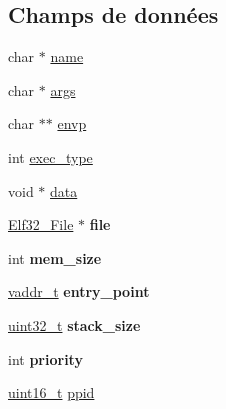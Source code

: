 \subsection*{Champs de données}
\begin{DoxyCompactItemize}
\item 
char $\ast$ \hyperlink{structprocess__init__data__t_a6bdcab0bceaafa6e65a236904fb5a157}{name}
\item 
char $\ast$ \hyperlink{structprocess__init__data__t_a16d011771835f06e0bb3d5fd6115e13c}{args}
\item 
char $\ast$$\ast$ \hyperlink{structprocess__init__data__t_a863d82fbd718f53164a520f67376eac2}{envp}
\item 
int \hyperlink{structprocess__init__data__t_a1cda790f7d2446a04562094f09e358ab}{exec\+\_\+type}
\item 
void $\ast$ \hyperlink{structprocess__init__data__t_ae950cc2a2cc04d1c00a71f70c2fde72c}{data}
\item 
\hypertarget{structprocess__init__data__t_a423d726f5e4621a1aae6a6d96ed2c380}{\hyperlink{structElf32__File}{Elf32\+\_\+\+File} $\ast$ {\bfseries file}}\label{structprocess__init__data__t_a423d726f5e4621a1aae6a6d96ed2c380}

\item 
\hypertarget{structprocess__init__data__t_ae720e802d58d2f1457e34998063695a1}{int {\bfseries mem\+\_\+size}}\label{structprocess__init__data__t_ae720e802d58d2f1457e34998063695a1}

\item 
\hypertarget{structprocess__init__data__t_acf333ed57db9a2ca636801dcbc41da7e}{\hyperlink{kernel_2include_2types_8h_a53428b953a0ae6fba02a5b3596c867e0}{vaddr\+\_\+t} {\bfseries entry\+\_\+point}}\label{structprocess__init__data__t_acf333ed57db9a2ca636801dcbc41da7e}

\item 
\hypertarget{structprocess__init__data__t_a8a9c2d2d0d602f8e2f3dc2f4c425da29}{\hyperlink{kernel_2include_2types_8h_a33594304e786b158f3fb30289278f5af}{uint32\+\_\+t} {\bfseries stack\+\_\+size}}\label{structprocess__init__data__t_a8a9c2d2d0d602f8e2f3dc2f4c425da29}

\item 
\hypertarget{structprocess__init__data__t_a3147915ee1aa09fd84245e28635c60c8}{int {\bfseries priority}}\label{structprocess__init__data__t_a3147915ee1aa09fd84245e28635c60c8}

\item 
\hyperlink{kernel_2include_2types_8h_adf4d876453337156dde61095e1f20223}{uint16\+\_\+t} \hyperlink{structprocess__init__data__t_a34f85f3f56546700b1dc942070944e27}{ppid}
\end{DoxyCompactItemize}


